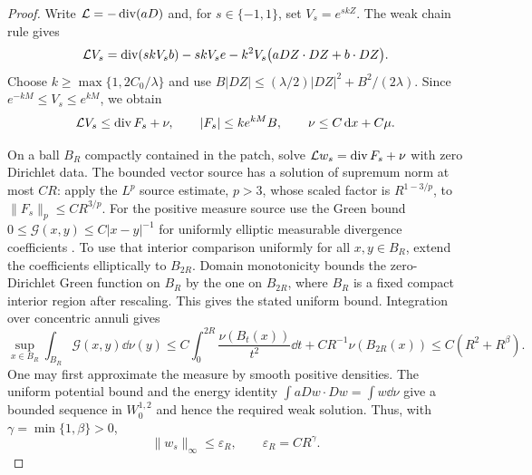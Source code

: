 \begin{proof}
Write $\mathcal L=-\operatorname{div}(aD)$ and, for $s\in\{-1,1\}$, set
$V_s=e^{skZ}$.  The weak chain rule gives
\begin{equation}\label{n3:existence:exponential-identity}
 \mathcal L V_s
 =\operatorname{div}(skV_sb)-skV_se
       -k^2V_s\bigl(aDZ\cdot DZ+b\cdot DZ\bigr).
\end{equation}
Choose $k\ge\max\{1,2C_0/\lambda\}$ and use
$B|DZ|\le(\lambda/2)|DZ|^2+B^2/(2\lambda)$.
Since $e^{-kM}\le V_s\le e^{kM}$, we obtain
\begin{equation}\label{n3:existence:exponential-subsolution}
 \mathcal L V_s\le\operatorname{div} F_s+\nu,
 \qquad |F_s|\le ke^{kM}B,
 \qquad \nu\le C\,\mathrm d x+C\mu.
\end{equation}

On a ball $B_R$ compactly contained in the patch, solve
$\mathcal L w_s=\operatorname{div} F_s+\nu$ with zero Dirichlet data.
The bounded vector source has a solution of supremum norm at most
$CR$: apply the $L^p$ source estimate, $p>3$, whose scaled factor
is $R^{1-3/p}$, to $\|F_s\|_p\le CR^{3/p}$.
For the positive measure source use the Green bound
$0\le\mathcal G(x,y)\le C|x-y|^{-1}$ for uniformly elliptic
measurable divergence coefficients
\cite[Section 7, Theorem (7.1) and Remark 2]{LittmanStampacchiaWeinberger1963}.
To use that interior comparison uniformly for all $x,y\in B_R$,
extend the coefficients elliptically to $B_{2R}$.  Domain
monotonicity bounds the zero-Dirichlet Green function on $B_R$
by the one on $B_{2R}$, where $B_R$ is a fixed compact interior
region after rescaling.  This gives the stated uniform bound.
Integration over concentric annuli gives
\begin{equation}\label{n3:existence:green-morrey-correction}
 \sup_{x\in B_R}\int_{B_R}\mathcal G(x,y)\dd\nu(y)
 \le C\int_0^{2R}\frac{\nu(B_t(x))}{t^2}\dd t
       +CR^{-1}\nu(B_{2R}(x))
 \le C(R^2+R^\beta).
\end{equation}
One may first approximate the measure by smooth positive densities.
The uniform potential bound and the energy identity
$\int aDw\cdot Dw=\int w\dd\nu$ give a bounded sequence in
$W^{1,2}_0$ and hence the required weak solution.  Thus, with
$\gamma=\min\{1,\beta\}>0$,
\begin{equation}\label{n3:existence:correction-size}
 \|w_s\|_\infty\le\varepsilon_R,
 \qquad \varepsilon_R=CR^\gamma.
\end{equation}


\end{proof}
